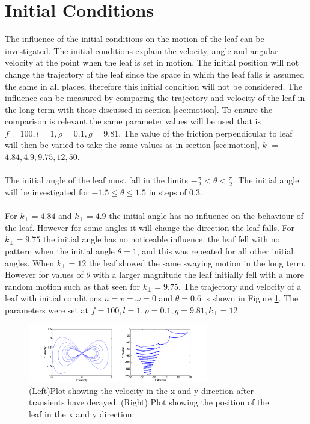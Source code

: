 \section{Initial Conditions}

The influence of the initial conditions on the motion of the leaf can be investigated. The initial conditions explain the velocity, angle and angular velocity at the point when the leaf is set in motion. The initial position will not change the trajectory of the leaf since the space in which the leaf falls is assumed the same in all places, therefore this initial condition will not be considered. The influence can be measured %
by comparing the trajectory and velocity of the leaf in the long term with those discussed in section \ref{sec:motion}. To ensure the comparison is relevant the same parameter values will be used that is $f=100, l=1, \rho = 0.1, g = 9.81$. The value of the friction perpendicular to leaf will then be varied to take the same values as in section \ref{sec:motion}, $k_{\perp}$=$4.84,4.9,9.75,12,50$.
\\
\\
The initial angle of the leaf must fall in the limits $-\frac{\pi}{2}<\theta<\frac{\pi}{2}$. The initial angle will be investigated for $-1.5\leq \theta \leq1.5$ in steps of 0.3. 
\\
\\
For $k_{\perp}=4.84$ and $k_{\perp}=4.9$ the initial angle has no influence on the behaviour of the leaf. However for some angles it will change the direction the leaf falls. For $k_{\perp}=9.75$ the initial angle has no noticeable influence, the leaf fell with no pattern when the initial angle $\theta=1$, and this was repeated for all other initial angles. When $k_{\perp}=12$ the leaf showed the same swaying motion in the long term. However for values of $\theta$ with a larger magnitude the leaf initially fell with a more random motion such as that seen for $k_{\perp}=9.75$. The trajectory and velocity of a leaf with initial conditions $u=v=\omega =0$ and $\theta=0.6$ is shown in Figure \ref{fig:kper12theta0_6}. The parameters were set at $f=100, l=1, \rho = 0.1, g = 9.81, k_{\perp} = 12$.

\begin{figure}[H]
\centering
\includegraphics[width=0.7\textwidth]{IA-1_2_kper12.png}
\caption{\label{fig:kper12theta0_6}(Left)Plot showing the velocity in the x and y direction after transients have decayed. (Right) Plot showing the position of the leaf in the x and y direction.
}
\end{figure}


